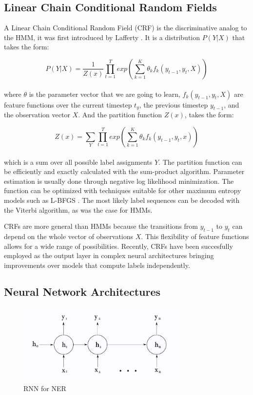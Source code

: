 \documentclass{nle}
\begin{document}
\subsection{Linear Chain Conditional Random Fields}

A Linear Chain Conditional Random Field (CRF) is the discriminative analog to the HMM,
it was first introduced by Lafferty \cite{Lafferty2001}. It is a distribution $ P(Y|X) $ that takes the form:

\begin{equation}
P(Y|X) = \frac{1}{Z(x)} \prod_{t=1}^{T} exp \left( \sum_{k=1}^{K} \theta_k f_k(y_{t-1}, y_t, X) \right)
\end{equation}
\\

where $ \theta $ is the parameter vector that we are going to learn, $ f_k(y_{t-1}, y_{t}, X) $ 
are feature functions over the current timestep $ t_y $, the previous timestep $ y_{t-1}$, 
and the observation vector $ X $. And the partition function $ Z(x) $, takes the form:

\begin{equation}
Z(x) = \sum_{Y} \prod_{t=1}^{T} exp \left( \sum_{k=1}^{K} \theta_k f_k(y_{t-1}, y_t, x) \right)
\end{equation}
\\

which is a sum over all possible label assignments $ Y $. The partition function can be efficiently
and exactly calculated with the sum-product algorithm. Parameter estimation is usually done through 
negative log likelihood minimization. The function can be optimized with techniques suitable for other 
maximum entropy models such as L-BFGS \cite{Liu1989}. The most likely label sequences can be decoded 
with the Viterbi algorithm, as was the case for HMMs.

CRFs are more general than HMMs because the transitions from $ y_{t-1} $ to $ y_{t} $ can depend 
on the whole vector of observations $ X $. This flexibility of feature functions allows for a wide range of
possibilities. Recently, CRFs have been succesfully employed as the output layer in complex neural 
architectures bringing improvements over models that compute labels independently.

\subsection{Neural Network Architectures}

\begin{figure}
  \centering
  \includegraphics[width=0.75\textwidth]{pics/rnn_network}
  \caption{RNN for NER}
  \label{fig:rnn_network}
\end{figure}
\end{document}
